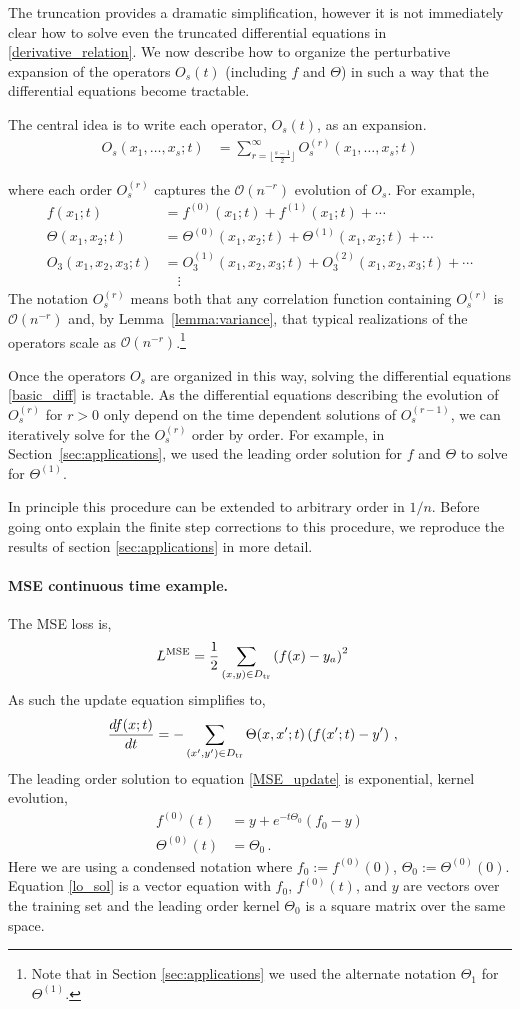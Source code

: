\documentclass[english]{article}
\newcommand{\es}[2] {\begin{align} \label{#1} #2 \end{align}}
\begin{document}
The truncation provides a dramatic simplification, however it is not immediately clear how to solve even the truncated differential equations in \eqref{derivative_relation}. We now describe how to organize the perturbative expansion of the operators $O_s(t)$ (including $f$ and $\Theta$) in such a way that the differential equations become tractable. 

The central idea is to write each operator, $O_s(t)$, as an expansion.
\es{expanded_ops}{
O_s(x_1,\ldots,x_s;t)&=\sum_{r=\lfloor\frac{s-1}{2}\rfloor}^{\infty}O_s^{(r)}(x_1,\ldots,x_s;t)
}

where each order $O_s^{(r)}$ captures the $\mathcal{O}(n^{-r})$ evolution of $O_s$. For example,
\es{expanded_ops_example}{
f(x_1;t)&=f^{(0)}(x_1;t)+f^{(1)}(x_1;t)+\cdots\nonumber\\
\Theta(x_1,x_2;t)&=\Theta^{(0)}(x_1,x_2;t)+\Theta^{(1)}(x_1,x_2;t)+\cdots\nonumber\\
O_3(x_1,x_2,x_3;t)&=O_3^{(1)}(x_1,x_2,x_3;t)+O_3^{(2)}(x_1,x_2,x_3;t)+\cdots\\
&\quad\!\!\!\vdots\nonumber
}
The notation $O_s^{(r)}$ means both that any correlation function containing $O_s^{(r)}$ is $\mathcal{O}(n^{-r})$ and, by Lemma~\ref{lemma:variance}, that typical realizations of the operators scale as $\mathcal{O}(n^{-r})$.\footnote{Note that in Section \ref{sec:applications} we used the alternate notation $\Theta_1$ for $\Theta^{(1)}$.}

Once the operators $O_s$ are organized in this way, solving the differential equations \eqref{basic_diff} is tractable. As the differential equations describing the evolution of $O_s^{(r)}$ for $r>0$ only depend on the time dependent solutions of $O_s^{(r-1)}$, we can iteratively solve for the $O_s^{(r)}$ order by order. For example, in Section~\ref{sec:applications}, we used the leading order solution for $f$ and $\Theta$ to solve for $\Theta^{(1)}$.

In principle this procedure can be extended to arbitrary order in $1/n$. Before going onto explain the finite step corrections to this procedure, we reproduce the results of section \ref{sec:applications} in more detail. 

\paragraph{MSE continuous time example.}

The MSE loss is,
\es{MSE}{
L^{\textrm{MSE}}&=\frac{1}{2}\sum_{(x,y)\in D_{\rm tr}}\left(f(x)-y_{a}\right)^{2}
}
As such the update equation simplifies to,
\es{MSE_update}{
\frac{df(x;t)}{dt}&=-\sum_{(x',y')\in D_{\rm tr}}\Theta(x,x';t)\left(f(x';t)-y'\right)\,,
}
The leading order solution to equation \eqref{MSE_update} is exponential, kernel evolution,
\es{lo_sol}{
f^{(0)}(t)&=y+e^{-t\Theta_{0}}(f_{0}-y)\\
\Theta^{(0)}(t)&=\Theta_{0}\,.
}
Here we are using a condensed notation where $f_0:=f^{(0)}(0)$, $\Theta_0:=\Theta^{(0)}(0)$. Equation \eqref{lo_sol} is a vector equation with $f_0$, $f^{(0)}(t)$, and $y$ are vectors over the training set and the leading order kernel $\Theta_0$ is a square matrix over the same space.
\end{document}
